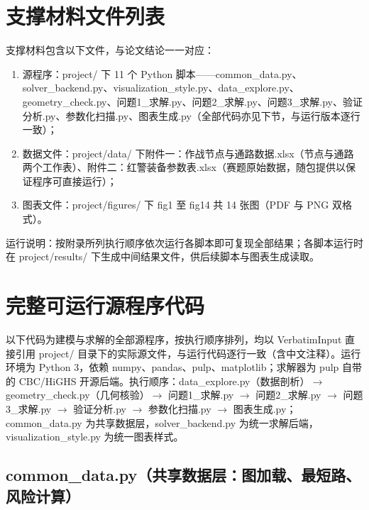 \documentclass[12pt,a4paper]{ctexart}
\begin{document}
\appendix
\sloppy  %

\section{支撑材料文件列表}

支撑材料包含以下文件，与论文结论一一对应：

\begin{enumerate}[label=(\arabic*),leftmargin=2em,itemsep=0.2em]
\item 源程序：project/ 下 11 个 Python 脚本——common\_data.py、solver\_backend.py、visualization\_style.py、data\_explore.py、geometry\_check.py、问题1\_求解.py、问题2\_求解.py、问题3\_求解.py、验证分析.py、参数化扫描.py、图表生成.py（全部代码亦见下节，与运行版本逐行一致）；
\item 数据文件：project/data/ 下附件一：作战节点与通路数据.xlsx（节点与通路两个工作表）、附件二：红警装备参数表.xlsx（赛题原始数据，随包提供以保证程序可直接运行）；
\item 图表文件：project/figures/ 下 fig1 至 fig14 共 14 张图（PDF 与 PNG 双格式）。
\end{enumerate}

运行说明：按附录所列执行顺序依次运行各脚本即可复现全部结果；各脚本运行时在 project/results/ 下生成中间结果文件，供后续脚本与图表生成读取。

\section{完整可运行源程序代码}

以下代码为建模与求解的全部源程序，按执行顺序排列，均以 VerbatimInput 直接引用 project/ 目录下的实际源文件，与运行代码逐行一致（含中文注释）。运行环境为 Python 3，依赖 numpy、pandas、pulp、matplotlib；求解器为 pulp 自带的 CBC/HiGHS 开源后端。执行顺序：data\_explore.py（数据剖析）$\to$ geometry\_check.py（几何核验）$\to$ 问题1\_求解.py $\to$ 问题2\_求解.py $\to$ 问题3\_求解.py $\to$ 验证分析.py $\to$ 参数化扫描.py $\to$ 图表生成.py；common\_data.py 为共享数据层，solver\_backend.py 为统一求解后端，visualization\_style.py 为统一图表样式。

\subsection{common\_data.py（共享数据层：图加载、最短路、风险计算）}
\end{document}
